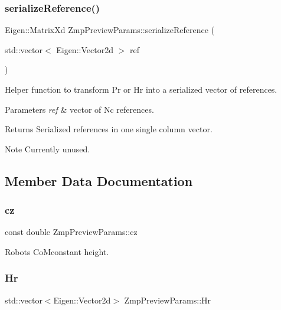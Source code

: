 \subsubsection{\texorpdfstring{serialize\+Reference()}{serializeReference()}}
{\footnotesize\ttfamily Eigen\+::\+Matrix\+Xd Zmp\+Preview\+Params\+::serialize\+Reference (\begin{DoxyParamCaption}\item[{std\+::vector$<$ Eigen\+::\+Vector2d $>$}]{ref }\end{DoxyParamCaption})\hspace{0.3cm}{\ttfamily [inline]}}

Helper function to transform Pr or Hr into a serialized vector of references.


\begin{DoxyParams}{Parameters}
{\em ref} & vector of Nc references. \\
\hline
\end{DoxyParams}
\begin{DoxyReturn}{Returns}
Serialized references in one single column vector. 
\end{DoxyReturn}
\begin{DoxyNote}{Note}
Currently unused. 
\end{DoxyNote}


\subsection{Member Data Documentation}
\hypertarget{structZmpPreviewParams_a19d944dc7a6b40e6e55068a62d33e546}{}\label{structZmpPreviewParams_a19d944dc7a6b40e6e55068a62d33e546} 
\subsubsection{\texorpdfstring{cz}{cz}}
{\footnotesize\ttfamily const double Zmp\+Preview\+Params\+::cz}

Robot\textquotesingle{}s Co\+Mconstant height. \hypertarget{structZmpPreviewParams_a5dc49bed0a434fd99f74517185792456}{}\label{structZmpPreviewParams_a5dc49bed0a434fd99f74517185792456} 
\subsubsection{\texorpdfstring{Hr}{Hr}}
{\footnotesize\ttfamily std\+::vector$<$Eigen\+::\+Vector2d$>$ Zmp\+Preview\+Params\+::\+Hr}

